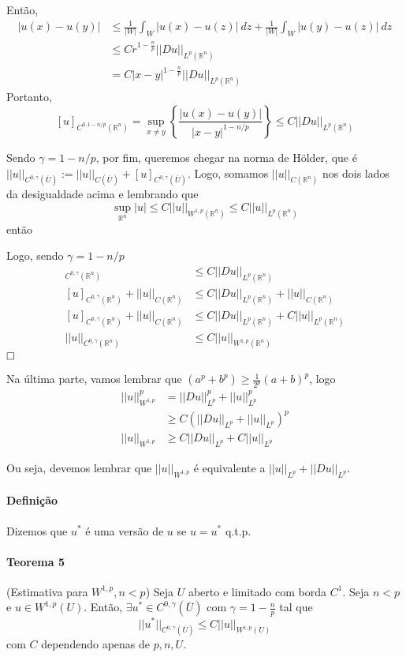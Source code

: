 \documentclass[a4paper, 11pt]{article}
\newcommand{\qed}{$\hfill\square$}
\newcommand{\Rn}{{\mathbb{R}^n}}
\newcommand{\rn}{{\mathbb{R}^n}}
\begin{document}
Então, \begin{align*}
	|u(x) - u(y)| &\leq \frac{1}{|W|}\int_W |u(x) -u(z)|\ dz + \frac{1}{|W|} \int_W |u(y) - u(z)| \ dz \\
	&\leq Cr^{1-\frac{n}{p}} ||Du||_{L^p(\rn)}\\
	&= C|x-y|^{1-\frac{n}{p}} ||Du||_{L^p(\rn)}
\end{align*} Portanto, \[ [u]_{C^{0, 1-n/p}(\rn)} = \sup_{x\neq y} \left\{ \frac{|u(x) - u(y)|}{|x-y|^{1-n/p}}\right\}   \leq C   ||Du||_{L^p(\rn)}    \]

Sendo $\gamma = 1 - n/p$, por fim, queremos chegar na norma de Hölder, que é $ ||u||_{C^{0,\gamma}(\overline{U})} := ||u||_{C(\overline{U})} + [u]_{C^{0,\gamma}(\overline{U})}  $. Logo, somamos $||u||_{C(\Rn)}$ nos dois lados da desigualdade acima e lembrando que \[ \sup_{\rn} |u| \leq C ||u||_{W^{1,p}(\rn)} \leq C ||u||_{L^p(\rn)}\] então

Logo, sendo $\gamma = 1 - n/p$ \begin{align*}
	[u]_{C^{0,\gamma}(\rn)}&\leq C ||Du||_{L^p(\rn)}  \\
	[u]_{C^{0,\gamma}(\rn)} + ||u||_{C(\rn)} &\leq C ||Du||_{L^p(\rn)} + ||u||_{C(\rn)} \\
	[u]_{C^{0,\gamma}(\rn)} + ||u||_{C(\rn)} &\leq C ||Du||_{L^p(\rn)} + C||u||_{L^p(\rn)} \\
	||u||_{C^{0,\gamma}(\rn)} & \leq C ||u||_{W^{1,p}(\rn)}
\end{align*}\qed

Na última parte, vamos lembrar que $ (a^p + b^p) \geq \frac{1}{2^p}(a+b)^p$, logo \begin{align*}
	||u||_{W^{1,p}}^p &= ||Du||_{L^p}^p + ||u||_{L^p}^p \\ &\geq C(||Du||_{L^p} + ||u||_{L^p}) ^p \\
	||u||_{W^{1,p}} &\geq C ||Du||_{L^p} + C ||u||_{L^p}
\end{align*}

Ou seja, devemos lembrar que $||u||_{W^{1,p}}$ é equivalente a $||u||_{L^p} + ||Du||_{L^p}$.


\paragraph{Definição} Dizemos que $u^*$ é uma versão de $u$ se $u=u^*$ q.t.p.


\paragraph{Teorema 5}\label{t:sobolev-ineq-t5} (Estimativa para \( W^{1,p}, n<p \)) Seja \(U\) aberto e limitado com borda \( C^1\). Seja \(  n<p \) e \(  u \in W^{1,p}(U)  \). Então, \(\exists u^* \in C^{0,\gamma}(\overline{U})\) com \( \gamma = 1 - \frac{n}{p}\) tal que \[ || u^* ||_{C^{0,\gamma}(\overline{U})} \leq C ||u||_{W^{1,p}(U)} \] com \(C\) dependendo apenas de \(p, n, U\).
\end{document}
